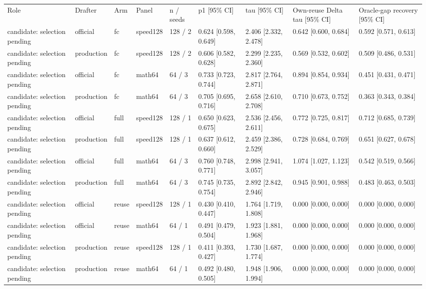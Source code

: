 \begin{tabular}{lllllllll}
Role & Drafter & Arm & Panel & n / seeds & p1 [95\% CI] & tau [95\% CI] & Own-reuse Delta tau [95\% CI] & Oracle-gap recovery [95\% CI] \\
candidate: selection pending & official & fc & speed128 & 128 / 2 & 0.624 [0.598, 0.649] & 2.406 [2.332, 2.478] & 0.642 [0.600, 0.684] & 0.592 [0.571, 0.613] \\
candidate: selection pending & production & fc & speed128 & 128 / 2 & 0.606 [0.582, 0.628] & 2.299 [2.235, 2.360] & 0.569 [0.532, 0.602] & 0.509 [0.486, 0.531] \\
candidate: selection pending & official & fc & math64 & 64 / 3 & 0.733 [0.723, 0.744] & 2.817 [2.764, 2.871] & 0.894 [0.854, 0.934] & 0.451 [0.431, 0.471] \\
candidate: selection pending & production & fc & math64 & 64 / 3 & 0.705 [0.695, 0.716] & 2.658 [2.610, 2.708] & 0.710 [0.673, 0.752] & 0.363 [0.343, 0.384] \\
candidate: selection pending & official & full & speed128 & 128 / 1 & 0.650 [0.623, 0.675] & 2.536 [2.456, 2.611] & 0.772 [0.725, 0.817] & 0.712 [0.685, 0.739] \\
candidate: selection pending & production & full & speed128 & 128 / 1 & 0.637 [0.612, 0.660] & 2.459 [2.386, 2.529] & 0.728 [0.684, 0.769] & 0.651 [0.627, 0.678] \\
candidate: selection pending & official & full & math64 & 64 / 3 & 0.760 [0.748, 0.771] & 2.998 [2.941, 3.057] & 1.074 [1.027, 1.123] & 0.542 [0.519, 0.566] \\
candidate: selection pending & production & full & math64 & 64 / 3 & 0.745 [0.735, 0.754] & 2.892 [2.842, 2.946] & 0.945 [0.901, 0.988] & 0.483 [0.463, 0.503] \\
candidate: selection pending & official & reuse & speed128 & 128 / 1 & 0.430 [0.410, 0.447] & 1.764 [1.719, 1.808] & 0.000 [0.000, 0.000] & 0.000 [0.000, 0.000] \\
candidate: selection pending & official & reuse & math64 & 64 / 1 & 0.491 [0.479, 0.504] & 1.923 [1.881, 1.968] & 0.000 [0.000, 0.000] & 0.000 [0.000, 0.000] \\
candidate: selection pending & production & reuse & speed128 & 128 / 1 & 0.411 [0.393, 0.427] & 1.730 [1.687, 1.774] & 0.000 [0.000, 0.000] & 0.000 [0.000, 0.000] \\
candidate: selection pending & production & reuse & math64 & 64 / 1 & 0.492 [0.480, 0.505] & 1.948 [1.906, 1.994] & 0.000 [0.000, 0.000] & 0.000 [0.000, 0.000] \\
\end{tabular}
